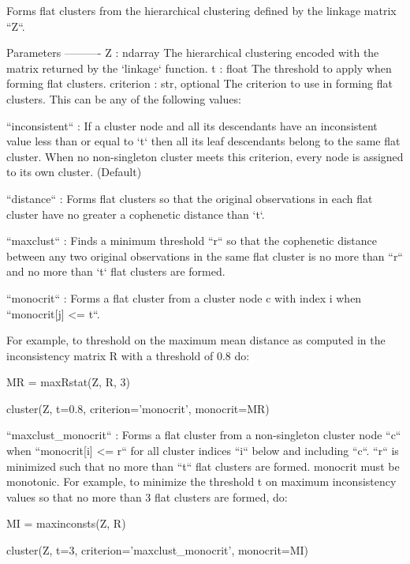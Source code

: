 \begin{DoxyVerb}Forms flat clusters from the hierarchical clustering defined by
the linkage matrix ``Z``.

Parameters
----------
Z : ndarray
    The hierarchical clustering encoded with the matrix returned
    by the `linkage` function.
t : float
    The threshold to apply when forming flat clusters.
criterion : str, optional
    The criterion to use in forming flat clusters. This can
    be any of the following values:

      ``inconsistent`` : If a cluster node and all its
          descendants have an inconsistent value less than or equal
          to `t` then all its leaf descendants belong to the
          same flat cluster. When no non-singleton cluster meets
          this criterion, every node is assigned to its own
          cluster. (Default)

      ``distance`` : Forms flat clusters so that the original
          observations in each flat cluster have no greater a
          cophenetic distance than `t`.

      ``maxclust`` : Finds a minimum threshold ``r`` so that
          the cophenetic distance between any two original
          observations in the same flat cluster is no more than
          ``r`` and no more than `t` flat clusters are formed.

      ``monocrit`` : Forms a flat cluster from a cluster node c
          with index i when ``monocrit[j] <= t``.

          For example, to threshold on the maximum mean distance
          as computed in the inconsistency matrix R with a
          threshold of 0.8 do:

            MR = maxRstat(Z, R, 3)

            cluster(Z, t=0.8, criterion='monocrit', monocrit=MR)

      ``maxclust_monocrit`` : Forms a flat cluster from a
          non-singleton cluster node ``c`` when ``monocrit[i] <=
          r`` for all cluster indices ``i`` below and including
          ``c``. ``r`` is minimized such that no more than ``t``
          flat clusters are formed. monocrit must be
          monotonic. For example, to minimize the threshold t on
          maximum inconsistency values so that no more than 3 flat
          clusters are formed, do:

            MI = maxinconsts(Z, R)

            cluster(Z, t=3, criterion='maxclust_monocrit', monocrit=MI)


\end{DoxyVerb}
